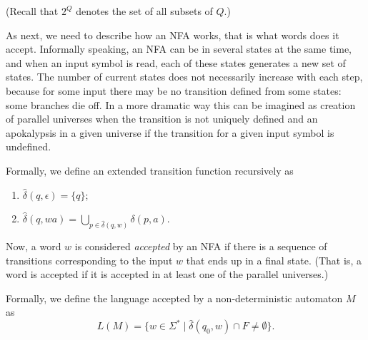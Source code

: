 

\setcounter{section}{1}
\setcounter{subsection}{3}
\setcounter{dfn}{6}

(Recall that $2^Q$ denotes the set of all subsets of $Q$.)

As next, we need to describe how an NFA works, that is what words does it accept.
Informally speaking, an NFA can be in several states at the same time, and when an input symbol is read, each of these states generates a new set of states.
The number of current states does not necessarily increase with each step, because for some input there may be no transition defined from some states:
some branches die off.
In a more dramatic way this can be imagined as creation of parallel universes when the transition is not uniquely defined
and an apokalypsis in a given universe if the transition for a given input symbol is undefined.

Formally, we define an extended transition function recursively as
\begin{enumerate}
\item
$\widehat{\delta}(q, \epsilon) = \{q\}$;
\item
$\widehat{\delta}(q, wa) = \bigcup\limits_{p \in \widehat{\delta}(q,w)} \delta(p, a)$.
\end{enumerate}

Now, a word $w$ is considered \emph{accepted} by an NFA if there is a sequence of transitions corresponding to the input $w$
that ends up in a final state.
(That is, a word is accepted if it is accepted in at least one of the parallel universes.)

Formally, we define the language accepted by a non-deterministic automaton $M$ as
\begin{equation}
\label{eqn:NFALanguage}
L(M) = \{w \in \Sigma^* \mid \widehat{\delta}(q_0, w) \cap F \ne \emptyset\}.
\end{equation}



